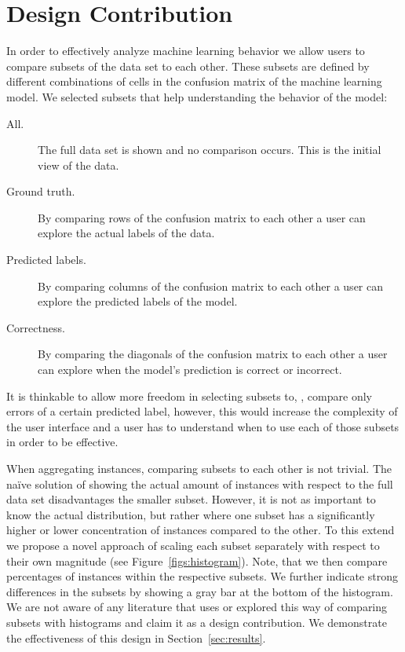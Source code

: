 \section{Design Contribution}
\label{sec:design}
In order to effectively analyze machine learning behavior we allow users to compare subsets of the data set to each other.
These subsets are defined by different combinations of cells in the confusion matrix of the machine learning model.
We selected subsets that help understanding the behavior of the model:

\begin{description}
\item[All.] The full data set is shown and no comparison occurs. This is the initial view of the data.
\item[Ground truth.] By comparing rows of the confusion matrix to each other a user can explore the actual labels of the data.
\item[Predicted labels.] By comparing columns of the confusion matrix to each other a user can explore the predicted labels of the model.
\item[Correctness.] By comparing the diagonals of the confusion matrix to each other a user can explore when the model's prediction is correct or incorrect.
\end{description}

It is thinkable to allow more freedom in selecting subsets to, \eg, compare only errors of a certain predicted label, however, this would increase the complexity of the user interface and a user has to understand when to use each of those subsets in order to be effective.

When aggregating instances, comparing subsets to each other is not trivial.
The na\"ive solution of showing the actual amount of instances with respect to the full data set disadvantages the smaller subset.
However, it is not as important to know the actual distribution, but rather where one subset has a significantly higher or lower concentration of instances compared to the other.
To this extend we propose a novel approach of scaling each subset separately with respect to their own magnitude (see Figure~\ref{figs:histogram}).
Note, that we then compare percentages of instances within the respective subsets.
We further indicate strong differences in the subsets by showing a gray bar at the bottom of the histogram.
We are not aware of any literature that uses or explored this way of comparing subsets with histograms and claim it as a design contribution.
We demonstrate the effectiveness of this design in Section~\ref{sec:results}.
